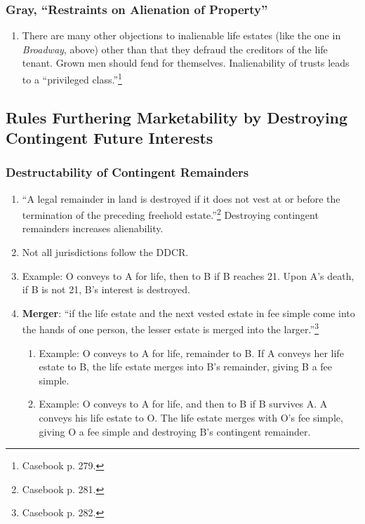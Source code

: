 \subsubsection{Gray, ``Restraints on Alienation of Property''}

\begin{enumerate}
    \item There are many other objections to inalienable life estates (like 
    the one in \emph{Broadway}, above) other than that they defraud the 
    creditors of the life tenant. Grown men should fend for themselves. 
    Inalienability of trusts leads to a ``privileged 
    class.''\footnote{Casebook p. 279.}
\end{enumerate}

\subsection{Rules Furthering Marketability by Destroying Contingent Future 
Interests}

\subsubsection{Destructability of Contingent Remainders}

\begin{enumerate}
    \item ``A legal remainder in land is destroyed if it does not vest at or 
    before the termination of the preceding freehold 
    estate.''\footnote{Casebook p. 281.} Destroying contingent remainders 
    increases alienability.
    \item Not all jurisdictions follow the DDCR.
    \item Example: O conveys to A for life, then to B if B reaches 21. Upon 
    A's death, if B is not 21, B's interest is destroyed.
    \item \textbf{Merger}: ``if the life estate and the next vested estate in 
    fee simple come into the hands of one person, the lesser estate is merged 
    into the larger.''\footnote{Casebook p. 282.}
    \begin{enumerate}
        \item Example: O conveys to A for life, remainder to B. If A conveys 
        her life estate to B, the life estate merges into B's remainder, 
        giving B a fee simple.
        \item Example: O conveys to A for life, and then to B if B survives A. 
        A conveys his life estate to O. The life estate merges with O's fee 
        simple, giving O a fee simple and destroying B's contingent remainder.
    \end{enumerate}
\end{enumerate}

